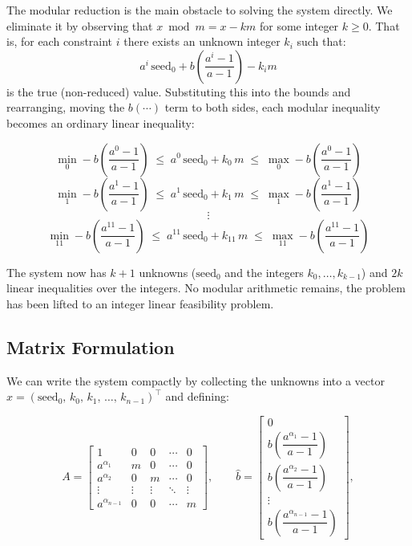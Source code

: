 \documentclass[11pt]{article}
\theoremstyle{plain}
\theoremstyle{definition}
\begin{document}
The modular reduction is the main obstacle to solving the system directly. We eliminate it by
observing that $x \bmod m = x - km$ for some integer $k \geq 0$. That is, for each constraint $i$
there exists an unknown integer $k_i$ such that:
\[
    a^i\,\text{seed}_0 + b\!\left(\frac{a^i-1}{a-1}\right) - k_i m
\]
is the true (non-reduced) value. Substituting this into the bounds and rearranging, moving the
$b(\cdots)$ term to both sides, each modular inequality becomes an ordinary linear inequality:

\[
\min_0 - b\!\left(\frac{a^0-1}{a-1}\right) \;\leq\; a^0\,\text{seed}_0 + k_0\, m \;\leq\; \max_0 - b\!\left(\frac{a^0-1}{a-1}\right)
\]
\[
\min_1 - b\!\left(\frac{a^1-1}{a-1}\right) \;\leq\; a^1\,\text{seed}_0 + k_1\, m \;\leq\; \max_1 - b\!\left(\frac{a^1-1}{a-1}\right)
\]
\[
\vdots
\]
\[
\min_{11} - b\!\left(\frac{a^{11}-1}{a-1}\right) \;\leq\; a^{11}\,\text{seed}_0 + k_{11}\, m \;\leq\; \max_{11} - b\!\left(\frac{a^{11}-1}{a-1}\right)
\]

The system now has $k+1$ unknowns ($\text{seed}_0$ and the integers $k_0, \ldots, k_{k-1}$) and
$2k$ linear inequalities over the integers. No modular arithmetic remains, the problem has
been lifted to an integer linear feasibility problem.

\subsection{Matrix Formulation}

We can write the system compactly by collecting the unknowns into a vector
$\hat{x} = (\text{seed}_0,\, k_0,\, k_1,\, \ldots,\, k_{n-1})^\top$ and defining:

\[
A = \begin{bmatrix}
1      & 0 & 0 & \cdots & 0 \\
a^{\alpha_1} & m & 0 & \cdots & 0 \\
a^{\alpha_2} & 0 & m & \cdots & 0 \\
\vdots & \vdots & \vdots & \ddots & \vdots \\
a^{\alpha_{n-1}} & 0 & 0 & \cdots & m
\end{bmatrix},
\qquad
\hat{b} = \begin{bmatrix}
0 \\
b\!\left(\dfrac{a^{\alpha_1}-1}{a-1}\right) \\[6pt]
b\!\left(\dfrac{a^{\alpha_2}-1}{a-1}\right) \\
\vdots \\
b\!\left(\dfrac{a^{\alpha_{n-1}}-1}{a-1}\right)
\end{bmatrix},
\]
\end{document}
